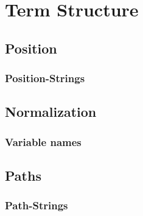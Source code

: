
\section{Term Structure}

\subsection{Position}
\begin{frame}
	\frametitle{Position-Strings}
	
\end{frame}

\subsection{Normalization}
\begin{frame}
	\frametitle{Variable names}
	
\end{frame}

\subsection{Paths}
\begin{frame}
	\frametitle{Path-Strings}
	
\end{frame}

%	

